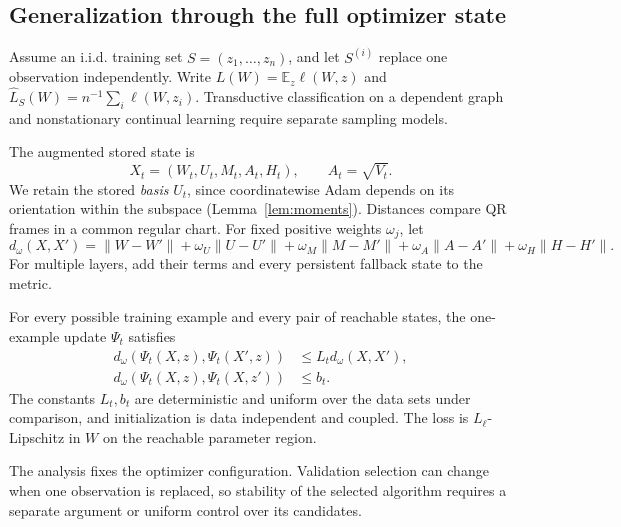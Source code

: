 \subsection{Generalization through the full optimizer state}
\label{app:generalization}

Assume an i.i.d. training set $S=(z_1,\ldots,z_n)$, and let $S^{(i)}$
replace one observation independently. Write $L(W)=\mathbb E_z\ell(W,z)$
and $\widehat L_S(W)=n^{-1}\sum_i\ell(W,z_i)$. Transductive classification
on a dependent graph and nonstationary continual learning require separate
sampling models.

The augmented stored state is
\begin{equation}
 X_t=(W_t,U_t,M_t,A_t,H_t),\qquad A_t=\sqrt{V_t}.
 \label{eq:augmented-state}
\end{equation}
We retain the stored \emph{basis} $U_t$, since coordinatewise Adam depends
on its orientation within the subspace (Lemma~\ref{lem:moments}). Distances
compare QR frames in a common regular chart. For fixed positive weights
$\omega_j$, let
\begin{equation}
 d_\omega(X,X')=\|W-W'\|+\omega_U\|U-U'\|
 +\omega_M\|M-M'\|+\omega_A\|A-A'\|+\omega_H\|H-H'\|.
\end{equation}
For multiple layers, add their terms and every persistent fallback state
to the metric.

\begin{assumption}
\label{ass:stability}
For every possible training example and every pair of reachable states,
the one-example update $\Psi_t$ satisfies
\begin{align}
 d_\omega(\Psi_t(X,z),\Psi_t(X',z))&\le L_t d_\omega(X,X'),\label{eq:same-sample}\\
 d_\omega(\Psi_t(X,z),\Psi_t(X,z'))&\le b_t.\label{eq:changed-sample}
\end{align}
The constants $L_t,b_t$ are deterministic and uniform over the data sets
under comparison, and initialization is data independent and coupled.
The loss is $L_\ell$-Lipschitz in $W$ on the reachable parameter region.
\end{assumption}

The analysis fixes the optimizer configuration. Validation selection can
change when one observation is replaced, so stability of the selected
algorithm requires a separate argument or uniform control over its candidates.

